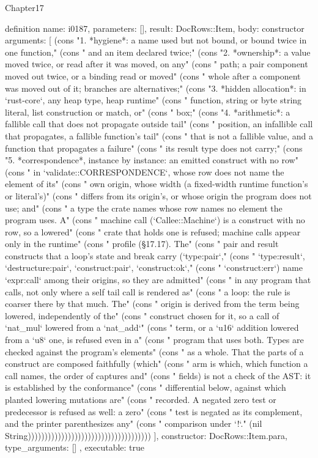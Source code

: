 \begin{lexlean}{Chapter17}
\begin{semanticmodule}
definition{
  name: i0187,
  parameters: [],
  result: DocRows::Item,
  body: constructor{
    arguments: [
      (cons "1. *hygiene*: a name used but not bound, or bound twice in one function," (cons "   and an item declared twice;" (cons "2. *ownership*: a value moved twice, or read after it was moved, on any" (cons "   path; a pair component moved out twice, or a binding read or moved" (cons "   whole after a component was moved out of it; branches are alternatives;" (cons "3. *hidden allocation*: in `rust-core`, any heap type, heap runtime" (cons "   function, string or byte string literal, list construction or match, or" (cons "   box;" (cons "4. *arithmetic*: a fallible call that does not propagate outside tail" (cons "   position, an infallible call that propagates, a fallible function's tail" (cons "   that is not a fallible value, and a function that propagates a failure" (cons "   its result type does not carry;" (cons "5. *correspondence*, instance by instance: an emitted construct with no row" (cons "   in `validate::CORRESPONDENCE`, whose row does not name the element of its" (cons "   own origin, whose width (a fixed-width runtime function's or literal's)" (cons "   differs from its origin's, or whose origin the program does not use; and" (cons "   a type the crate names whose row names no element the program uses. A" (cons "   machine call (`Callee::Machine`) is a construct with no row, so a lowered" (cons "   crate that holds one is refused; machine calls appear only in the runtime" (cons "   profile (§17.17). The" (cons "   pair and result constructs that a loop's state and break carry (`type:pair`," (cons "   `type:result`, `destructure:pair`, `construct:pair`, `construct:ok`," (cons "   `construct:err`) name `expr:call` among their origins, so they are admitted" (cons "   in any program that calls, not only where a self tail call is rendered as" (cons "   a loop: the rule is coarser there by that much. The" (cons "   origin is derived from the term being lowered, independently of the" (cons "   construct chosen for it, so a call of `nat_mul` lowered from a `nat_add`" (cons "   term, or a `u16` addition lowered from a `u8` one, is refused even in a" (cons "   program that uses both. Types are checked against the program's elements" (cons "   as a whole. That the parts of a construct are composed faithfully (which" (cons "   arm is which, which function a call names, the order of captures and" (cons "   fields) is not a check of the AST: it is established by the conformance" (cons "   differential below, against which planted lowering mutations are" (cons "   recorded. A negated zero test or predecessor is refused as well: a zero" (cons "   test is negated as its complement, and the printer parenthesizes any" (cons "   comparison under `!`." (nil String)))))))))))))))))))))))))))))))))))))
    ],
    constructor: DocRows::Item.para,
    type_arguments: []
  },
  executable: true
}


\end{semanticmodule}
\end{lexlean}
